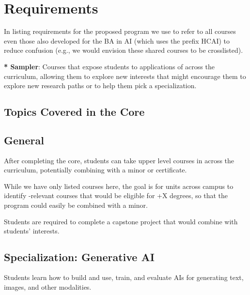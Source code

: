 \documentclass[
10pt, %
a4paper, %
oneside, %
headinclude,footinclude, %
BCOR5mm, %
]{scrartcl}
\begin{document}


\section{Requirements}

In listing requirements for the proposed program we use \prefix{} to
refer to all courses even those also developed for the BA in AI (which
uses the prefix HCAI) to
reduce confusion (e.g., we would envision these shared courses to be crosslisted).



\textbf{ * Sampler}: Courses that expose students to applications of \ai{}
across the curriculum, allowing them to explore new interests that
might encourage them to explore new research paths or to help them
pick a specialization.

\subsection{Topics Covered in the Core}



\subsection{General}

After completing the core, students can take upper level courses in \ai{} across the curriculum, potentially combining with a minor or certificate.



While we have only listed  courses here, the goal is for units across campus to identify \ai{}-relevant courses that would be eligible for \ai{}+X degrees, so that the \ai{} program could easily be combined with a minor.

Students are required to complete a capstone project that would combine \ai{} with students' interests.

\subsection{Specialization: Generative AI}

    Students learn how to build and use, train, and evaluate AIs for generating text, images, and other modalities.

\end{document}

